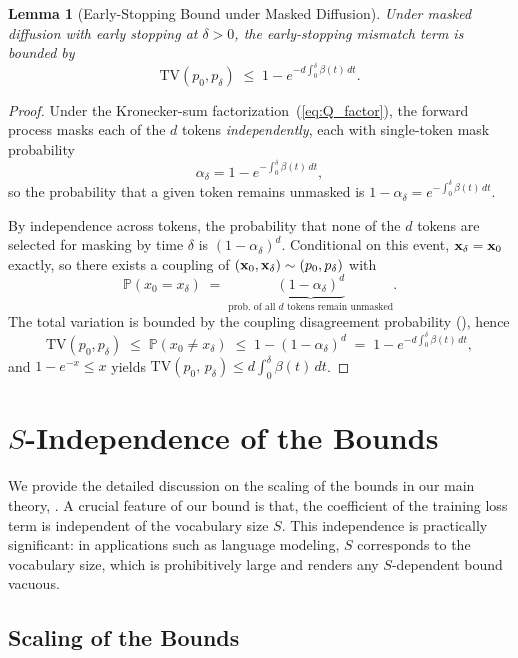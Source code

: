 \documentclass{article} %
\newtheorem{lemma}[theorem]{Lemma}
\def\eqref#1{equation~\ref{#1}}
\newcommand{\bfx}{{\bf x}}
\newcommand{\TV}{\mathrm{TV}}
\renewcommand{\eqref}[1]{\textup{(\ref{#1})}}
\begin{document}
\begin{lemma}[Early-Stopping Bound under Masked Diffusion]\label{lemma:early_stop_masked}
    Under masked diffusion with early stopping at $\delta>0$, the early-stopping mismatch term is bounded by
    \begin{equation}
        \TV(p_0, p_\delta) \;\leq\; 1 - e^{-d\int_0^\delta \beta(t)\,dt} .
    \end{equation}
\end{lemma}
\begin{proof}
Under the Kronecker-sum factorization~\eqref{eq:Q_factor}, the forward process masks each of the $d$ tokens \emph{independently}, each with single-token mask probability
\begin{equation}
    \alpha_\delta = 1 - e^{-\int_0^\delta \beta(t)\,dt},
\end{equation}
so the probability that a given token remains unmasked is $1-\alpha_\delta = e^{-\int_0^\delta \beta(t)\,dt}$.

By independence across tokens, the probability that none of the $d$ tokens are selected for masking by time $\delta$ is $(1-\alpha_\delta)^d$. Conditional on this event, $\bfx_\delta = \bfx_0$ exactly, so there exists a coupling of $(\bfx_0, \bfx_\delta)\sim (p_0, p_\delta)$ with
$$
\mathbb{P}(x_0 = x_\delta) \;=\; \underbrace{(1-\alpha_\delta)^d}_{\text{prob. of all $d$ tokens remain unmasked}}.
$$
The total variation is bounded by the coupling disagreement probability (), hence
$$
\TV(p_0, p_\delta) \;\leq\; \mathbb{P}(x_0 \neq x_\delta) \;\leq\; 1 - (1-\alpha_\delta)^d \;=\; 1 - e^{-d\int_0^\delta \beta(t)\,dt},
$$
and $1 - e^{-x} \le x$ yields $\TV(p_0,\, p_\delta) \le d\int_0^\delta \beta(t)\,dt$. 
\end{proof}

\section{\texorpdfstring{$S$}{S}-Independence of the Bounds}\label{sec:bound_scale}
We provide the detailed discussion on the scaling of the bounds in our main theory, . A crucial feature of our bound is that, the coefficient of the training loss term is independent of the vocabulary size $S$. This independence is practically significant: in applications such as language modeling, $S$ corresponds to the vocabulary size, which is prohibitively large and renders any $S$-dependent bound vacuous.
\subsection{Scaling of the Bounds}
\label{ssec:bound_scale}
\end{document}
